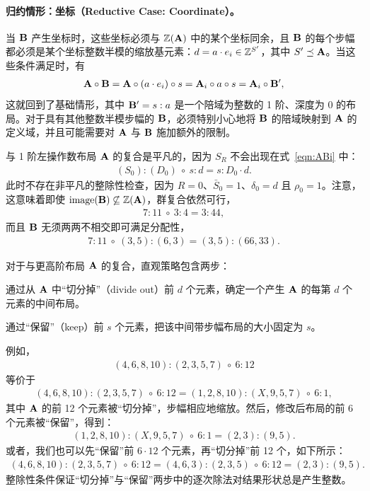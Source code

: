 \paragraph{归约情形：坐标（Reductive Case: Coordinate）。}

当 $\mathbf{B}$ 产生坐标时，这些坐标必须与 $\mathbb{Z}(\mathbf{A})$ 中的某个坐标同余，且 $\mathbf{B}$ 的每个步幅都必须是某个坐标整数半模的缩放基元素：$d = a \cdot e_i \in \mathbb{Z}^{S'}$，其中 $S' \preceq \mathbf{A}$。当这些条件满足时，有
\begin{align*}
\mathbf{A} \circ \mathbf{B} = \mathbf{A} \circ (a \cdot e_i) \circ s = \mathbf{A}_i \circ a \circ s = \mathbf{A}_i \circ \mathbf{B}',
\end{align*}
这就回到了基础情形，其中 $\mathbf{B}' = s : a$ 是一个陪域为整数的 1 阶、深度为 0 的布局。对于具有其他整数半模步幅的 $\mathbf{B}$，必须特别小心地将 $\mathbf{B}$ 的陪域映射到 $\mathbf{A}$ 的定义域，并且可能需要对 $\mathbf{A}$ 与 $\mathbf{B}$ 施加额外的限制。


与 1 阶左操作数布局 $\mathbf{A}$ 的复合是平凡的，因为 $S_R$ 不会出现在式~\eqref{eqn:ABi} 中：
\begin{align*}
(S_0):(D_0) \ \circ \  s:d = s:D_0 \cdot d.
\end{align*}
此时不存在非平凡的整除性检查，因为 $R = 0$、$\bar{S}_0 = 1$、$\delta_0 = d$ 且 $\rho_0 = 1$。注意，这意味着即使 $\text{image}(\mathbf{B}) \not\subseteq \mathbb{Z}(\mathbf{A})$，群复合依然可行，
\begin{align*}
7:11 \ \circ \ 3:4 = 3:44,
\end{align*}
而且 $\mathbf{B}$ 无须两两不相交即可满足分配性，
\begin{align*}
7:11 \ \circ \ (3,5):(6,3) = (3,5):(66,33).
\end{align*}

对于与更高阶布局 $\mathbf{A}$ 的复合，直观策略包含两步：
\begin{compactitem}
\item 通过从 $\mathbf{A}$ 中“切分掉”（divide out）前 $d$ 个元素，确定一个产生 $\mathbf{A}$ 的每第 $d$ 个元素的中间布局。
\item 通过“保留”（keep）前 $s$ 个元素，把该中间带步幅布局的大小固定为 $s$。
\end{compactitem}
例如，
\begin{align*}
(4,6,8,10):(2,3,5,7) \ \circ \  6:12
\end{align*}
等价于
\begin{align*}
(4,6,8,10):(2,3,5,7) \ \circ \  6:12 = (1,2,8,10):(X,9,5,7) \ \circ \  6:1,
\end{align*}
其中 $\mathbf{A}$ 的前 12 个元素被“切分掉”，步幅相应地缩放。然后，修改后布局的前 6 个元素被“保留”，得到：
\begin{align*}
(1,2,8,10):(X,9,5,7) \ \circ \  6:1 = (2,3):(9,5).
\end{align*}
或者，我们也可以先“保留”前 $6 \cdot 12$ 个元素，再“切分掉”前 12 个，如下所示：
\begin{align*}
(4,6,8,10):(2,3,5,7) \ \circ \  6:12 = (4,6,3):(2,3,5) \ \circ \  6:12 = (2,3):(9,5).
\end{align*}
整除性条件保证“切分掉”与“保留”两步中的逐次除法对结果形状总是产生整数。

